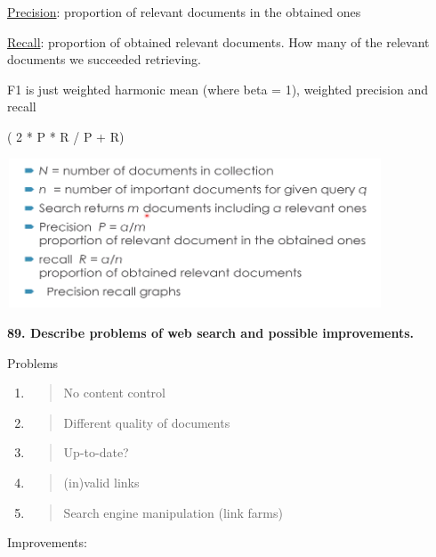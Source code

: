 \underline{Precision}: proportion of relevant documents in the obtained
ones

\underline{Recall}: proportion of obtained relevant documents. How many
of the relevant documents we succeeded retrieving.

F1 is just weighted harmonic mean (where beta = 1), weighted precision
and recall

( 2 * P * R / P + R)

\includegraphics[width=4.39063in,height=1.74856in]{media/image15.png}

\textbf{89. Describe problems of web search and possible improvements.}

Problems

\begin{enumerate}
\def\labelenumi{\arabic{enumi}.}
\item
  \begin{quote}
  No content control
  \end{quote}
\item
  \begin{quote}
  Different quality of documents
  \end{quote}
\item
  \begin{quote}
  Up-to-date?
  \end{quote}
\item
  \begin{quote}
  (in)valid links
  \end{quote}
\item
  \begin{quote}
  Search engine manipulation (link farms)
  \end{quote}
\end{enumerate}

Improvements:


